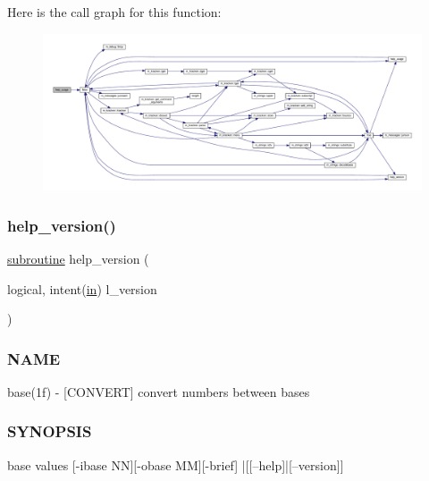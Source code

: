 Here is the call graph for this function\+:
\nopagebreak
\begin{figure}[H]
\begin{center}
\leavevmode
\includegraphics[width=350pt]{base_8f90_a3e09a3b52ee8fb04eeb93fe5761626a8_cgraph}
\end{center}
\end{figure}
\mbox{\label{base_8f90_a39c21619b08a3c22f19e2306efd7f766}} 
\subsubsection{\texorpdfstring{help\+\_\+version()}{help\_version()}}
{\footnotesize\ttfamily \hyperlink{M__stopwatch_83_8txt_acfbcff50169d691ff02d4a123ed70482}{subroutine} help\+\_\+version (\begin{DoxyParamCaption}\item[{logical, intent(\hyperlink{M__journal_83_8txt_afce72651d1eed785a2132bee863b2f38}{in})}]{l\+\_\+version }\end{DoxyParamCaption})}



\subsubsection*{N\+A\+ME}

base(1f) -\/ \mbox{[}C\+O\+N\+V\+E\+RT\mbox{]} convert numbers between bases

\subsubsection*{S\+Y\+N\+O\+P\+S\+IS}

\begin{DoxyVerb}base values [-ibase NN][-obase MM][-brief] |[[--help]|[--version]]
\end{DoxyVerb}


